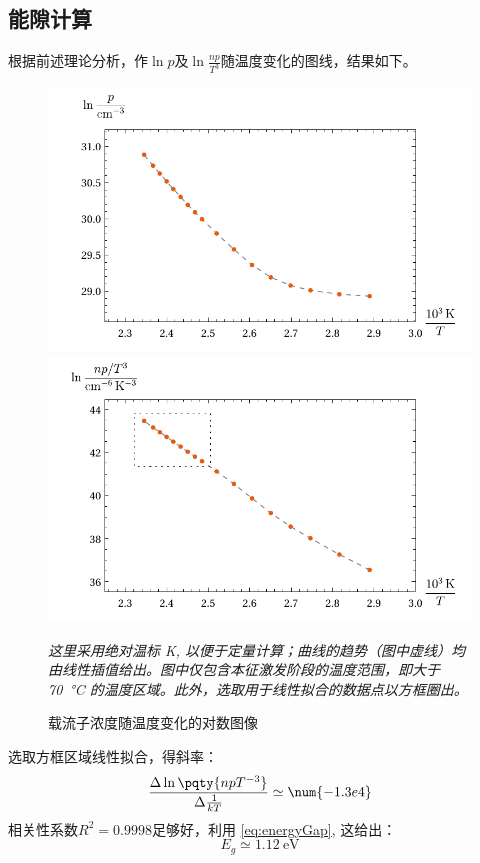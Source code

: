 \documentclass[aps,pre,12pt,preprint,%
	onecolumn,showpacs,showkeys,nofootinbib]{revtex4-1}
\begin{document}
\subsection{能隙计算}
	\vspace{-.5\baselineskip}
	根据前述理论分析，作$\ln p$及$\ln\frac{np}{T^3}$随温度变化的图线，结果如下。
	\begin{figure}[!h]
	\vspace{-1ex}
	\centering
	\includegraphics[width=.8\linewidth]{logPplot.pdf}\\
	\includegraphics[width=.8\linewidth]{logNPplot.pdf}
	\caption[载流子浓度对数图]{%
		载流子浓度随温度变化的对数图像}
	\vspace{1ex}
	\raggedright\small
	\textit{\hphantom{说明}
		这里采用绝对温标 \si{\K}, 以便于定量计算；曲线的趋势（图中虚线）均由线性插值给出。图中仅包含本征激发阶段的温度范围，即大于 \SI{70}{\celsius} 的温度区域。此外，选取用于线性拟合的数据点以方框圈出。
	\vspace{-3ex}}
	\label{fig:logNP}
	\end{figure}
	
	选取方框区域线性拟合，得斜率：
	\begin{equation}
		\frac{\Delta\ln\pqty{npT^{-3}}}
			{\Delta\frac{1}{kT}} \simeq \num{-1.3e4}
	\end{equation}
	相关性系数$R^2 = 0.9998$足够好，利用 \eqref{eq:energyGap}, 这给出：
	\begin{equation}
		E_g \simeq \SI{1.12}{\eV}
	\end{equation}
\end{document}

